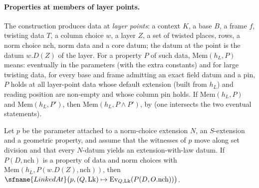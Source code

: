 \paragraph{Properties at members of layer points.}
The construction produces data at \emph{layer points}: a context $K$, a base $B$, a frame $f$, twisting data $T$, a column choice
$w$, a layer $Z$, a set of twisted places, rows, a norm choice $\mathrm{nch}$, norm data and a core datum; the datum at the point
is the datum $w.D(Z)$ of the layer. For a property $P$ of such data, $\mathrm{Mem}(h_L,P)$ means: eventually in the parameters (with
the extra constants) and for large twisting data, for every base and frame admitting an exact field datum and a pin, $P$ holds at
all layer-point data whose default extension (built from $h_L$) and reading position are non-empty and whose column pin holds.
If $\mathrm{Mem}(h_L,P)$ and $\mathrm{Mem}(h_L,P')$, then $\mathrm{Mem}(h_L,P\wedge P')$, by
 (one intersects the two eventual statements).

\begin{proposition}\label{pf:linkN:transport}
Let $p$ be the parameter attached to a norm-choice extension $N$, an $S$-extension and a geometric property, and assume that the
witnesses of $p$ move along set division and that every $N$-datum yields an extension-with-law datum. If $P(D,\mathrm{nch})$ is a
property of data and norm choices with $\mathrm{Mem}(h_L,P(w.D(Z),\mathrm{nch}))$, then
$\sfname{LinkedAt}\bigl(p,(Q,\mathrm{Lk})\mapsto\mathrm{Ev}_{Q,\mathrm{Lk}}(P(D,O.\mathrm{nch}))\bigr)$.
\end{proposition}


